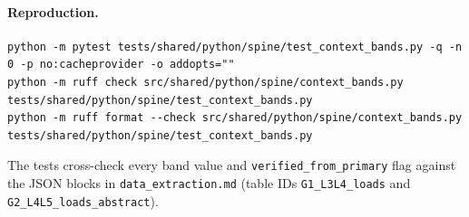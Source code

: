 \paragraph{Reproduction.}
\begin{verbatim}
python -m pytest tests/shared/python/spine/test_context_bands.py -q -n 0 -p no:cacheprovider -o addopts=""
python -m ruff check src/shared/python/spine/context_bands.py tests/shared/python/spine/test_context_bands.py
python -m ruff format --check src/shared/python/spine/context_bands.py tests/shared/python/spine/test_context_bands.py
\end{verbatim}
The tests cross-check every band value and \texttt{verified\_from\_primary} flag
against the JSON blocks in \texttt{data\_extraction.md} (table IDs
\texttt{G1\_L3L4\_loads} and \texttt{G2\_L4L5\_loads\_abstract}).
